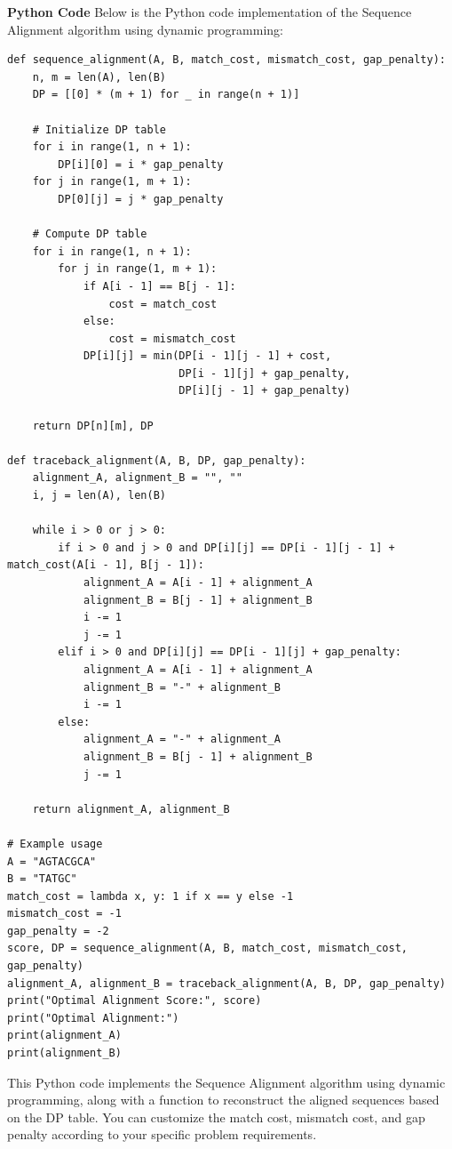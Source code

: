 \documentclass[12pt]{book} %
\begin{document}
\textbf{Python Code}
\FloatBarrier
Below is the Python code implementation of the Sequence Alignment algorithm using dynamic programming:
\FloatBarrier
\begin{lstlisting}
def sequence_alignment(A, B, match_cost, mismatch_cost, gap_penalty):
    n, m = len(A), len(B)
    DP = [[0] * (m + 1) for _ in range(n + 1)]

    # Initialize DP table
    for i in range(1, n + 1):
        DP[i][0] = i * gap_penalty
    for j in range(1, m + 1):
        DP[0][j] = j * gap_penalty

    # Compute DP table
    for i in range(1, n + 1):
        for j in range(1, m + 1):
            if A[i - 1] == B[j - 1]:
                cost = match_cost
            else:
                cost = mismatch_cost
            DP[i][j] = min(DP[i - 1][j - 1] + cost,
                           DP[i - 1][j] + gap_penalty,
                           DP[i][j - 1] + gap_penalty)

    return DP[n][m], DP

def traceback_alignment(A, B, DP, gap_penalty):
    alignment_A, alignment_B = "", ""
    i, j = len(A), len(B)

    while i > 0 or j > 0:
        if i > 0 and j > 0 and DP[i][j] == DP[i - 1][j - 1] + match_cost(A[i - 1], B[j - 1]):
            alignment_A = A[i - 1] + alignment_A
            alignment_B = B[j - 1] + alignment_B
            i -= 1
            j -= 1
        elif i > 0 and DP[i][j] == DP[i - 1][j] + gap_penalty:
            alignment_A = A[i - 1] + alignment_A
            alignment_B = "-" + alignment_B
            i -= 1
        else:
            alignment_A = "-" + alignment_A
            alignment_B = B[j - 1] + alignment_B
            j -= 1

    return alignment_A, alignment_B

# Example usage
A = "AGTACGCA"
B = "TATGC"
match_cost = lambda x, y: 1 if x == y else -1
mismatch_cost = -1
gap_penalty = -2
score, DP = sequence_alignment(A, B, match_cost, mismatch_cost, gap_penalty)
alignment_A, alignment_B = traceback_alignment(A, B, DP, gap_penalty)
print("Optimal Alignment Score:", score)
print("Optimal Alignment:")
print(alignment_A)
print(alignment_B)
\end{lstlisting}
\FloatBarrier
This Python code implements the Sequence Alignment algorithm using dynamic programming, along with a function to reconstruct the aligned sequences based on the DP table. You can customize the match cost, mismatch cost, and gap penalty according to your specific problem requirements.
\end{document}
